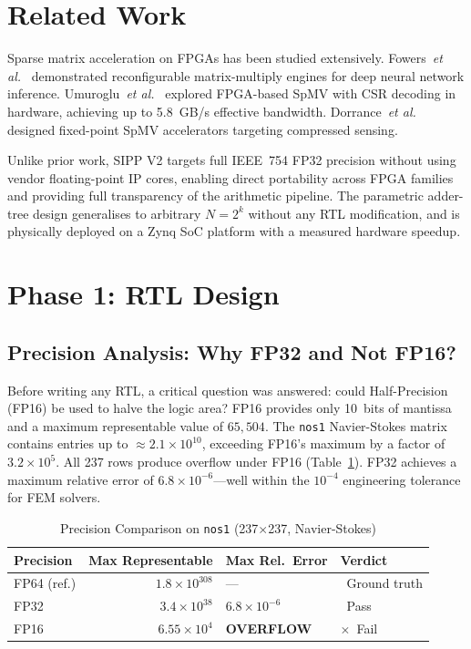 \documentclass[journal,a4paper]{IEEEtran}
\newcommand{\tick}{\textcolor{green!55!black}{\textbf{\checkmark}}}
\newcommand{\cross}{\textcolor{red!70!black}{\textbf{$\times$}}}
\begin{document}
\section{Related Work}

Sparse matrix acceleration on FPGAs has been studied extensively.
Fowers~\textit{et al.}~\cite{fowers2018} demonstrated reconfigurable
matrix-multiply engines for deep neural network inference.
Umuroglu~\textit{et al.}~\cite{umuroglu2015} explored FPGA-based SpMV
with CSR decoding in hardware, achieving up to 5.8~GB/s effective bandwidth.
Dorrance~\textit{et al.}~\cite{dorrance2014} designed fixed-point SpMV
accelerators targeting compressed sensing.

Unlike prior work, SIPP V2 targets full IEEE~754 FP32 precision without
using vendor floating-point IP cores, enabling direct portability across
FPGA families and providing full transparency of the arithmetic pipeline.
The parametric adder-tree design generalises to arbitrary $N = 2^k$
without any RTL modification, and is physically deployed on a Zynq
SoC platform with a measured hardware speedup.

\section{Phase 1: RTL Design}

\subsection{Precision Analysis: Why FP32 and Not FP16?}

Before writing any RTL, a critical question was answered: could
Half-Precision (FP16) be used to halve the logic area? FP16 provides
only 10~bits of mantissa and a maximum representable value of $65{,}504$.
The \texttt{nos1} Navier-Stokes matrix contains entries up to
${\approx}2.1\!\times\!10^{10}$, exceeding FP16's maximum by a factor
of $3.2\!\times\!10^5$. All 237 rows produce overflow under FP16
(Table~\ref{tab:precision}).
FP32 achieves a maximum relative error of $6.8\!\times\!10^{-6}$---well
within the $10^{-4}$ engineering tolerance for FEM solvers.

\begin{table}[!t]
\centering
\caption{Precision Comparison on \texttt{nos1} (237$\times$237,
Navier-Stokes)}
\label{tab:precision}
\begin{tabular}{lrll}
\toprule
Precision & Max Representable & Max Rel.\ Error & Verdict \\
\midrule
FP64 (ref.) & $1.8\!\times\!10^{308}$ & ---                      & \tick\ Ground truth \\
FP32        & $3.4\!\times\!10^{38}$  & $6.8\!\times\!10^{-6}$   & \tick\ Pass \\
FP16        & $6.55\!\times\!10^{4}$  & \textbf{OVERFLOW}         & \cross\ Fail \\
\bottomrule
\end{tabular}
\end{table}
\end{document}
